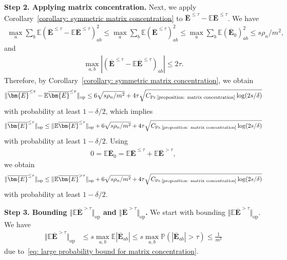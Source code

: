 \documentclass[11pt]{article}
\newcommand{\op}{\mathrm{op}}
\newcommand{\bE}{\bm{E}}
\newcommand{\bbE}{\mathbb{E}}
\newcommand{\bbP}{\mathbb{P}}
\newcommand{\constantBandeira}{C_{\text{Pr.\ref{proposition: matrix concentration}}}}
\newcommand{\<}{\langle}
\renewcommand{\>}{\rangle}
\newcommand{\avgMatrix}{\overline{\bm{E}}}
\newcommand{\avgLessT}{\overline{\bm{E}}^{\le\tau}}
\newcommand{\avgLarge}{\overline{\bm{E}}^{> \tau}}
\theoremstyle{plain}
\theoremstyle{definition}
\theoremstyle{remark}
\begin{document}
{\noindent \textbf{Step 2. Applying matrix concentration.} Next, we apply Corollary~\ref{corollary: symmetric matrix concentration} to $\avgLessT - \bbE \avgLessT$. We have
\begin{align*}
    \max_a \sum_b \bbE (\avgLessT - \bbE \avgLessT)_{ab}^2 \le \max_a \sum_b \bbE (\avgLessT)_{ab}^2 \le \max_a \sum_b \bbE (\overline{\bE}_0)_{ab}^2 \le s \rho_n / m^2,
\end{align*}
and
\begin{align*}
    \max_{a, b} \left | (\avgLessT - \bbE \avgLessT)_{ab} \right | \le 2\tau.
\end{align*}
Therefore, by Corollary~\ref{corollary: symmetric matrix concentration}, we obtain
\begin{align*}
    \Vert \avgLessT - \bbE \avgLessT \Vert_{\op} \le 6 \sqrt{s \rho_n / m^2} + 4\tau \sqrt{\constantBandeira \log(2s/\delta)}
\end{align*}
with probability at least $1 - \delta/2$,
which implies
\begin{align*}
    \Vert \avgLessT \Vert_{\op} \le \Vert  \bbE \avgLessT \Vert_{\op} + 6 \sqrt{s \rho_n / m^2} + 4\tau \sqrt{\constantBandeira \log(2s/\delta)}
\end{align*}
with probability at least $1 - \delta/2$. Using
\begin{align*}
    0 = \bbE \overline{\bE}_0 = \bbE \avgLessT + \bbE \avgLarge,
\end{align*}
we obtain
\begin{align*}
    \Vert \avgLessT \Vert_{\op} \le \Vert \bbE \avgLarge \Vert_{\op} + 6 \sqrt{s \rho_n / m^2} + 4 \tau \sqrt{\constantBandeira \log(2s/\delta)}
\end{align*}
with probability at least $1 - \delta/2$.

\noindent \textbf{Step 3. Bounding $ \Vert \bbE \avgLarge \Vert_{\op}$ and $\Vert \avgLarge \Vert_{\op}$.} We start with bounding $\Vert \bbE \avgLarge \Vert_{\op}$. We have
\begin{align*}
    \Vert \bbE \avgLarge \Vert_{\op} & \le s \max_{a, b} \bbE |\avgMatrix_{ab}| \le s \max_{a, b} \bbP(|\avgMatrix_{ab}| > \tau) \le \frac{1}{m^2}
\end{align*}
due to~\eqref{eq: large probability bound for matrix concentration}.

}
\end{document}
